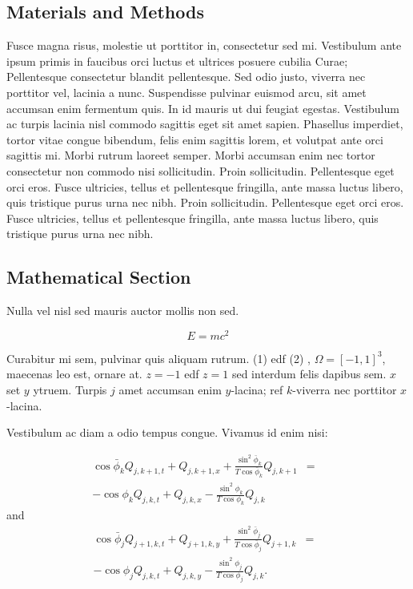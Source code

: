 \documentclass[a0,landscape]{a0poster}
\begin{document}
\begin{multicols}{4}
\section*{Materials and Methods}

Fusce magna risus, molestie ut porttitor in, consectetur sed mi. Vestibulum ante ipsum primis in faucibus orci luctus et ultrices posuere cubilia Curae; Pellentesque consectetur blandit pellentesque. Sed odio justo, viverra nec porttitor vel, lacinia a nunc. Suspendisse pulvinar euismod arcu, sit amet accumsan enim fermentum quis. In id mauris ut dui feugiat egestas. Vestibulum ac turpis lacinia nisl commodo sagittis eget sit amet sapien. Phasellus imperdiet, tortor vitae congue bibendum, felis enim sagittis lorem, et volutpat ante orci sagittis mi. Morbi rutrum laoreet semper. Morbi accumsan enim nec tortor consectetur non commodo nisi sollicitudin. Proin sollicitudin. Pellentesque eget orci eros. Fusce ultricies, tellus et pellentesque fringilla, ante massa luctus libero, quis tristique purus urna nec nibh. Proin sollicitudin. Pellentesque eget orci eros. Fusce ultricies, tellus et pellentesque fringilla, ante massa luctus libero, quis tristique purus urna nec nibh.


\subsection*{Mathematical Section}

Nulla vel nisl sed mauris auctor mollis non sed. 

\begin{equation}
E = mc^{2}
\label{eqn:Einstein}
\end{equation}

Curabitur mi sem, pulvinar quis aliquam rutrum. (1) edf (2)
, $\Omega=[-1,1]^3$, maecenas leo est, ornare at. $z=-1$ edf $z=1$ sed interdum felis dapibus sem. $x$ set $y$ ytruem. 
Turpis $j$ amet accumsan enim $y$-lacina; 
ref $k$-viverra nec porttitor $x$-lacina. 

Vestibulum ac diam a odio tempus congue. Vivamus id enim nisi:

\begin{eqnarray}
\cos\bar{\phi}_k Q_{j,k+1,t} + Q_{j,k+1,x}+\frac{\sin^2\bar{\phi}_k}{T\cos\bar{\phi}_k} Q_{j,k+1} &=&\nonumber\\ 
-\cos\phi_k Q_{j,k,t} + Q_{j,k,x}-\frac{\sin^2\phi_k}{T\cos\phi_k} Q_{j,k}\label{edgek}
\end{eqnarray}
and
\begin{eqnarray}
\cos\bar{\phi}_j Q_{j+1,k,t} + Q_{j+1,k,y}+\frac{\sin^2\bar{\phi}_j}{T\cos\bar{\phi}_j} Q_{j+1,k}&=&\nonumber \\
-\cos\phi_j Q_{j,k,t} + Q_{j,k,y}-\frac{\sin^2\phi_j}{T\cos\phi_j} Q_{j,k}.\label{edgej}
\end{eqnarray} 


\end{multicols}
\end{document}

